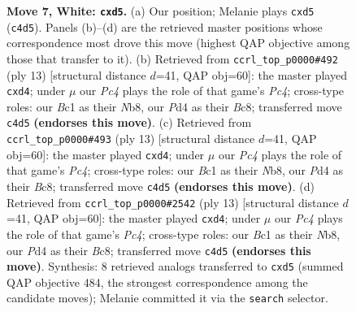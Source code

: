 \documentclass[11pt]{article}
\begin{document}
\begin{figure}[p]
\caption{\textbf{Move 7, White: \texttt{cxd5}.} (a) Our position; Melanie plays \texttt{cxd5} (\texttt{c4d5}). Panels (b)--(d) are the retrieved master positions whose correspondence most drove this move (highest QAP objective among those that transfer to it). (b) Retrieved from \texttt{ccrl\_top\_p0000\#492} (ply 13) [structural distance $d$=41, QAP obj=60]: the master played \texttt{cxd4}; under $\mu$ our \emph{Pc4} plays the role of that game's \emph{Pc4}; cross-type roles: our \emph{B}c1 as their \emph{N}b8, our \emph{P}d4 as their \emph{B}c8; transferred move \texttt{c4d5} \textbf{(endorses this move)}. (c) Retrieved from \texttt{ccrl\_top\_p0000\#493} (ply 13) [structural distance $d$=41, QAP obj=60]: the master played \texttt{cxd4}; under $\mu$ our \emph{Pc4} plays the role of that game's \emph{Pc4}; cross-type roles: our \emph{B}c1 as their \emph{N}b8, our \emph{P}d4 as their \emph{B}c8; transferred move \texttt{c4d5} \textbf{(endorses this move)}. (d) Retrieved from \texttt{ccrl\_top\_p0000\#2542} (ply 13) [structural distance $d$=41, QAP obj=60]: the master played \texttt{cxd4}; under $\mu$ our \emph{Pc4} plays the role of that game's \emph{Pc4}; cross-type roles: our \emph{B}c1 as their \emph{N}b8, our \emph{P}d4 as their \emph{B}c8; transferred move \texttt{c4d5} \textbf{(endorses this move)}. Synthesis: 8 retrieved analogs transferred to \texttt{cxd5} (summed QAP objective 484, the strongest correspondence among the candidate moves); Melanie committed it via the \texttt{search} selector.}
\label{fig:thought-m12}
\end{figure}

\clearpage
\end{document}
